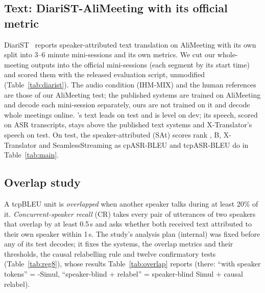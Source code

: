 \subsection{Text: DiariST-AliMeeting with its official metric}
\label{app:diarist}
DiariST~\citep{yang2024diarist} reports speaker-attributed text translation on AliMeeting with its own split into 3--6
minute mini-sessions and its own metrics. We cut our whole-meeting outputs into the official mini-sessions (each
segment by its start time) and scored them with the released evaluation script, unmodified (Table~\ref{tab:diarist}).
The audio condition (IHM-MIX) and the human references are those of our AliMeeting test; the published systems are
trained on AliMeeting and decode each mini-session separately, ours are not trained on it and decode whole meetings
online. \sys{}'s text leads on test and is level on dev; its speech, scored on ASR transcripts, stays above the
published text systems and X-Translator's speech on test. On test, the speaker-attributed (SAt) scores rank \sys{}, B,
X-Translator and SeamlessStreaming as cpASR-BLEU and tcpASR-BLEU do in Table~\ref{tab:main}.


\subsection{Overlap study}
\label{app:v8}
\label{sec:eval-overlap}
A tcpBLEU unit is \emph{overlapped} when another speaker talks during at least 20\% of it. \emph{Concurrent-speaker
recall} (CR) takes every pair of utterances of two speakers that overlap by at least 0.5\,s and asks whether both
received text attributed to their own speaker within 1\,s. The study's analysis plan (internal) was fixed before any of
its test decodes; it fixes the systems, the overlap metrics and their thresholds, the causal relabelling rule and twelve
confirmatory tests (Table~\ref{tab:reg8}), whose results Table~\ref{tab:overlap} reports (there: ``with speaker
tokens'' = \sys{}-Simul, ``speaker-blind + relabel'' = speaker-blind Simul + causal relabel).


